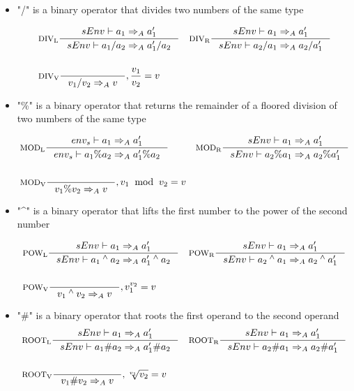 \begin{itemize}
\item "/" is a binary operator that divides two numbers of the same type

\begin{align*}
&\inference[$\text{DIV}_\text{L}$]{sEnv\vdash a_1 \Rightarrow_A a_1'}
                    {sEnv\vdash a_1 / a_2 \Rightarrow_A a_1' / a_2}
&
&\inference[$\text{DIV}_\text{R}$]{sEnv\vdash a_1 \Rightarrow_A a_1'}
                    {sEnv\vdash a_2 / a_1 \Rightarrow_A a_2 / a_1'}
\\\\
&\inference[$\text{DIV}_\text{V}$]{}
                    {v_1 / v_2 \Rightarrow_A v}
                    {, \frac{v_1}{v_2} = v}
\end{align*}

\item "\%" is a binary operator that returns the remainder of a floored division of two numbers of the same type

\begin{align*}
&\inference[$\text{MOD}_\text{L}$]{env_s\vdash a_1 \Rightarrow_A a_1'}
                    {env_s\vdash a_1 \% a_2 \Rightarrow_A a_1' \% a_2}
&
&\inference[$\text{MOD}_\text{R}$]{sEnv\vdash a_1 \Rightarrow_A a_1'}
                    {sEnv\vdash a_2 \% a_1 \Rightarrow_A a_2 \% a_1'}
\\\\
&\inference[$\text{MOD}_\text{V}$]{}
                    {v_1 \% v_2 \Rightarrow_A v}
                    {, v_1 \;\; \textrm{mod} \;\; v_2 = v}
\end{align*}

\item "\^{}" is a binary operator that lifts the first number to the power of the second number

\begin{align*}
&\inference[$\text{POW}_\text{L}$]{sEnv\vdash a_1  \Rightarrow_A a_1'}
                    {sEnv\vdash a_1 \Twedge a_2 \Rightarrow_A a_1' \Twedge a_2}
&
&\inference[$\text{POW}_\text{R}$]{sEnv\vdash a_1 \Rightarrow_A a_1'}
                    {sEnv\vdash a_2 \Twedge a_1 \Rightarrow_A a_2 \Twedge a_1'}
\\\\
&\inference[$\text{POW}_\text{V}$]{}
                    {v_1 \Twedge v_2 \Rightarrow_A v}
                    {, v_1 ^ {v_2} = v}
\end{align*}

\item "\#" is a binary operator that roots the first operand to the second operand
\begin{align*}
&\inference[$\text{ROOT}_\text{L}$]{sEnv\vdash a_1 \Rightarrow_A a_1'}
                    {sEnv\vdash a_1 \# a_2 \Rightarrow_A a_1' \# a_2}
&
&\inference[$\text{ROOT}_\text{R}$]{sEnv\vdash a_1 \Rightarrow_A a_1'}
                    {sEnv\vdash a_2 \# a_1 \Rightarrow_A a_2 \# a_1'}
\\\\
&\inference[$\text{ROOT}_\text{V}$]{}
                    {v_1 \# v_2 \Rightarrow_A v}
                    {, \sqrt[v_1]{v_2} = v}
\end{align*}


\end{itemize}
